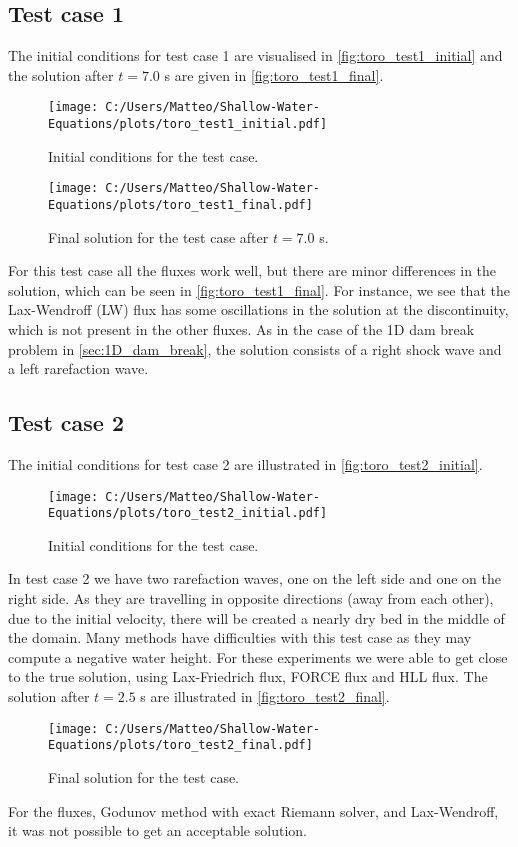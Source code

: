 \subsection*{Test case 1}
The initial conditions for test case 1 are visualised in \autoref{fig:toro_test1_initial} and the solution after $t=7.0$ s are given in \autoref{fig:toro_test1_final}.
\begin{figure}[H]
    \centering
    \texttt{[image: C:/Users/Matteo/Shallow-Water-Equations/plots/toro\_test1\_initial.pdf]}
    \caption{Initial conditions for the test case.}\label{fig:toro_test1_initial}
\end{figure}
\begin{figure}[H]
    \centering
    \texttt{[image: C:/Users/Matteo/Shallow-Water-Equations/plots/toro\_test1\_final.pdf]}
    \caption{Final solution for the test case after $t=7.0$ s.}\label{fig:toro_test1_final}
\end{figure}
For this test case all the fluxes work well, but there are minor differences in the solution, which can be seen in \autoref{fig:toro_test1_final}.
For instance, we see that the Lax-Wendroff (LW) flux has some oscillations in the solution at the discontinuity, which is not present in the other fluxes.
As in the case of the 1D dam break problem in \autoref{sec:1D_dam_break}, the solution consists of a right shock wave and a left rarefaction wave.


\subsection*{Test case 2}
The initial conditions for test case 2 are illustrated in \autoref{fig:toro_test2_initial}.
\begin{figure}[H]
    \centering
    \texttt{[image: C:/Users/Matteo/Shallow-Water-Equations/plots/toro\_test2\_initial.pdf]}
    \caption{Initial conditions for the test case.}\label{fig:toro_test2_initial}
\end{figure}
In test case 2 we have two rarefaction waves, one on the left side and one on the right side.
As they are travelling in opposite directions (away from each other), due to the initial velocity, there will be created a nearly dry bed in the middle of the domain.
Many methods have difficulties with this test case as they may compute a negative water height.
For these experiments we were able to get close to the true solution, using Lax-Friedrich flux, FORCE flux and HLL flux.
The solution after $t=2.5$ s are illustrated in \autoref{fig:toro_test2_final}.
\begin{figure}[H]
    \centering
    \texttt{[image: C:/Users/Matteo/Shallow-Water-Equations/plots/toro\_test2\_final.pdf]}
    \caption{Final solution for the test case.}\label{fig:toro_test2_final}
\end{figure}
For the fluxes, Godunov method with exact Riemann solver, and Lax-Wendroff, it was not possible to get an acceptable solution.

